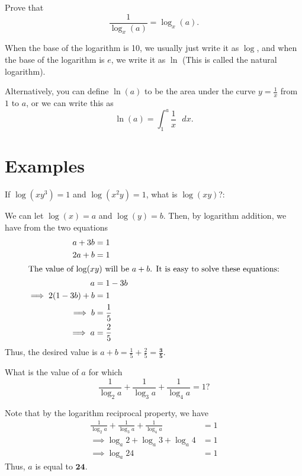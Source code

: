 \documentclass[sexy]{scrartcl}
\newcommand{\ansbold}[1]{\mathbf{#1}}
\begin{document}
\begin{exercise}
Prove that \[\frac{1}{\log_x(a)} = \log_x(a).\]
\end{exercise}

When the base of the logarithm is 10, we usually just write it as $\log$, and when the base of the logarithm is $e$, we write it as $\ln$ (This is called the natural logarithm).

Alternatively, you can define $\ln(a)$ to be the area under the curve $y=\frac{1}{x}$ from $1$ to $a$, or we can write this as \[\ln(a)=\int_1^a \frac{1}{x} \text{ } dx.\]

\section{Examples}

\begin{example}[AMC 12B 2003/17]
If $\log (xy^3) = 1$ and $\log (x^2y) = 1$, what is $\log (xy)$?:
\end{example}
\begin{soln}
We can let $\log(x)=a$ and $\log(y)=b$. Then, by logarithm addition, we have from the two equations 
\begin{align*}
    a + 3b &= 1\\
    2a + b &= 1\\ 
\intertext{The value of $\log(xy)$ will be $a+b$. It is easy to solve these equations:}
    a &= 1-3b\\
    \implies 2(1-3b) + b &= 1 \\
    \implies b &= \frac15\\
    \implies a &= \frac25
\end{align*}
Thus, the desired value is $a + b = \frac15 + \frac25 = \ansbold{\frac35}$.
\end{soln}

\begin{example}
What is the value of $a$ for which \[\frac1{\log_2a}+\frac1{\log_3a}+\frac1{\log_4a}=1?\]
\end{example}
\begin{soln}
Note that by the logarithm reciprocal property, we have
\begin{align*}
    \frac1{\log_2a}+\frac1{\log_3a}+\frac1{\log_4a}&=1\\
    \implies \log_a2+\log_a3+\log_a4&=1\\
    \implies \log_a24&=1
\end{align*}
Thus, $a$ is equal to $\ansbold{24}$. 
\end{soln}
\end{document}
